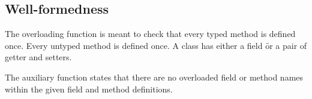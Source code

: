 \documentclass[a4paper,USenglish]{tex/lipics-v2016}
\begin{document}
\begin{mathpar}


\end{mathpar}

\subsection{Well-formedness}

The overloading function is meant to check that every typed method is
defined once. Every untyped method is defined once. A class has either a
field \f or a pair of getter and setters. \\


\begin{mathpar}
\end{mathpar}


\begin{mathpar}
\end{mathpar}

The  auxiliary function states that there are no overloaded 
field or method names within the given field and method definitions. \\

\begin{mathpar}



\end{mathpar}
\end{document}
